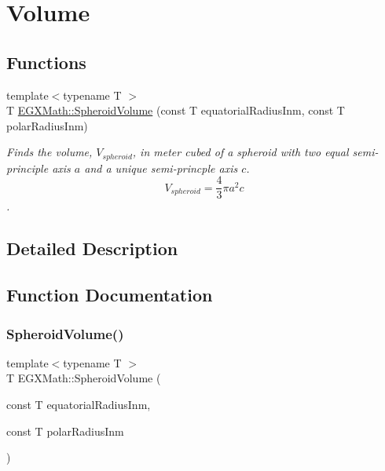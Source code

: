 \hypertarget{group___e_g_x_math-_geometry-3_d-_spheroid-_volume}{}\section{Volume}
\label{group___e_g_x_math-_geometry-3_d-_spheroid-_volume}
\subsection*{Functions}
\begin{DoxyCompactItemize}
\item 
{\footnotesize template$<$typename T $>$ }\\T \mbox{\hyperlink{group___e_g_x_math-_geometry-3_d-_spheroid-_volume_ga12125484235e94b8f2580f3476b05b92}{E\+G\+X\+Math\+::\+Spheroid\+Volume}} (const T equatorial\+Radius\+Inm, const T polar\+Radius\+Inm)
\begin{DoxyCompactList}\small\item\em Finds the volume, $V_{spheroid}$, in meter cubed of a spheroid with two equal semi-\/principle axis $a$ and a unique semi-\/princple axis $c$. \[ V_{spheroid}=\frac{4}{3}\pi a^2 c \]. \end{DoxyCompactList}\end{DoxyCompactItemize}


\subsection{Detailed Description}


\subsection{Function Documentation}
\mbox{\label{group___e_g_x_math-_geometry-3_d-_spheroid-_volume_ga12125484235e94b8f2580f3476b05b92}} 
\subsubsection{\texorpdfstring{Spheroid\+Volume()}{SpheroidVolume()}}
{\footnotesize\ttfamily template$<$typename T $>$ \\
T E\+G\+X\+Math\+::\+Spheroid\+Volume (\begin{DoxyParamCaption}\item[{const T}]{equatorial\+Radius\+Inm,  }\item[{const T}]{polar\+Radius\+Inm }\end{DoxyParamCaption})}



